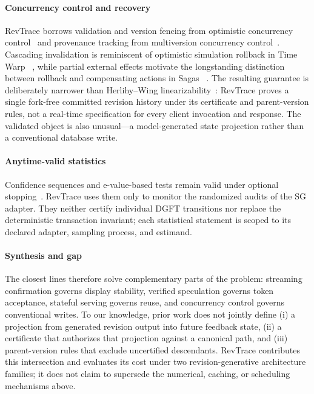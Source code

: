 \paragraph{Concurrency control and recovery}
RevTrace borrows validation and version fencing from optimistic concurrency
control~\cite{kung1981occ} and provenance tracking from multiversion
concurrency control~\cite{bernstein1983mvcc}. Cascading invalidation is
reminiscent of optimistic simulation rollback in Time Warp
~\cite{jefferson1985virtualtime}, while partial external effects motivate the
longstanding distinction between rollback and compensating actions in Sagas
~\cite{garciamolina1987sagas}. The resulting guarantee is deliberately
narrower than Herlihy--Wing linearizability~\cite{herlihy1990linearizability}:
RevTrace proves a single fork-free committed revision history under its
certificate and parent-version rules, not a real-time specification for every
client invocation and response. The validated object is also unusual---a
model-generated state projection rather than a conventional database write.

\paragraph{Anytime-valid statistics}
Confidence sequences and e-value-based tests remain valid under optional
stopping~\cite{howard2021confidence,ramdas2023savi,grunwald2024safetesting}.
RevTrace uses them only to monitor the randomized audits of the SG adapter.
They neither certify individual DGFT transitions nor replace the deterministic
transaction invariant; each statistical statement is scoped to its declared
adapter, sampling process, and estimand.

\paragraph{Synthesis and gap}
The closest lines therefore solve complementary parts of the problem:
streaming confirmation governs display stability, verified speculation governs
token acceptance, stateful serving governs reuse, and concurrency control
governs conventional writes. To our knowledge, prior work does not jointly
define (i) a projection from generated revision output into future feedback
state, (ii) a certificate that authorizes that projection against a canonical
path, and (iii) parent-version rules that exclude uncertified descendants.
RevTrace contributes this intersection and evaluates its cost under two
revision-generative architecture families; it does not claim to supersede the
numerical, caching, or scheduling mechanisms above.
